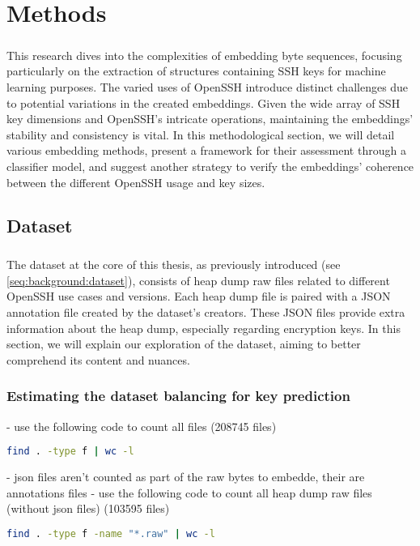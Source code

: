 \chapter{Methods}\label{chap:methods}
    \paragraph{}This research dives into the complexities of embedding byte sequences, focusing particularly on the extraction of structures containing SSH keys for machine learning purposes. The varied uses of OpenSSH introduce distinct challenges due to potential variations in the created embeddings. Given the wide array of SSH key dimensions and OpenSSH's intricate operations, maintaining the embeddings' stability and consistency is vital. In this methodological section, we will detail various embedding methods, present a framework for their assessment through a classifier model, and suggest another strategy to verify the embeddings' coherence between the different OpenSSH usage and key sizes.

    \section{Dataset}
        \paragraph{}The dataset at the core of this thesis, as previously introduced (see \ref{seq:background:dataset}), consists of heap dump raw files related to different OpenSSH use cases and versions. Each heap dump file is paired with a JSON annotation file created by the dataset's creators. These JSON files provide extra information about the heap dump, especially regarding encryption keys. In this section, we will explain our exploration of the dataset, aiming to better comprehend its content and nuances.

        \subsection{Estimating the dataset balancing for key prediction}
            - use the following code to count all files (208745 files)
            \begin{lstlisting}[caption={Count all dataset files}, label=methods:code:count_all_dataset_files, language=bash]
                find . -type f | wc -l
            \end{lstlisting}
            - json files aren't counted as part of the raw bytes to embedde, their are annotations files
            - use the following code to count all heap dump raw files (without json files) (103595 files)
            \begin{lstlisting}[caption={Count heap dump raw dataset files}, label=methods:code:count_raw_files, language=bash]
                find . -type f -name "*.raw" | wc -l
            \end{lstlisting}

